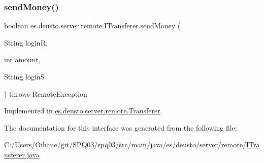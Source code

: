 \subsubsection{\texorpdfstring{send\+Money()}{sendMoney()}}
{\footnotesize\ttfamily boolean es.\+deusto.\+server.\+remote.\+I\+Transferer.\+send\+Money (\begin{DoxyParamCaption}\item[{String}]{loginR,  }\item[{int}]{amount,  }\item[{String}]{loginS }\end{DoxyParamCaption}) throws Remote\+Exception}



Implemented in \hyperlink{classes_1_1deusto_1_1server_1_1remote_1_1_transferer_ad1eb84155ba0c457645f2ad53725320d}{es.\+deusto.\+server.\+remote.\+Transferer}.



The documentation for this interface was generated from the following file\+:\begin{DoxyCompactItemize}
\item 
C\+:/\+Users/\+Oihane/git/\+S\+P\+Q03/spq03/src/main/java/es/deusto/server/remote/\hyperlink{_i_transferer_8java}{I\+Transferer.\+java}\end{DoxyCompactItemize}
